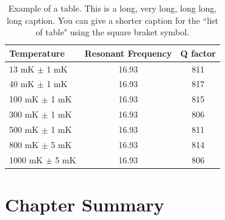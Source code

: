\begin{table}[p]
	\centering
	\caption[Short version of the caption.]{Example of a table. This is a long, very long, long long, long caption.  You can give a shorter caption for the ``list of table" using the square braket symbol.}
	\vspace{\baselineskip}
	\begin{tabular}{l c c}
		\hline
		\hline
		Temperature & Resonant Frequency & Q factor\\
		\hline
		13 mK $\pm$ 1 mK & 16.93 & 811 \\
		40 mK $\pm$ 1 mK & 16.93 & 817 \\
		100 mK $\pm$ 1 mK & 16.93 & 815 \\
		300 mK $\pm$ 1 mK & 16.93 & 806\\
		500 mK $\pm$ 1 mK & 16.93 & 811\\
		800 mK $\pm$ 5 mK & 16.93 & 814\\
		1000 mK $\pm$ 5 mK & 16.93 & 806 \\
		\hline
		\hline
	\end{tabular}
\end{table}

\section{Chapter Summary}